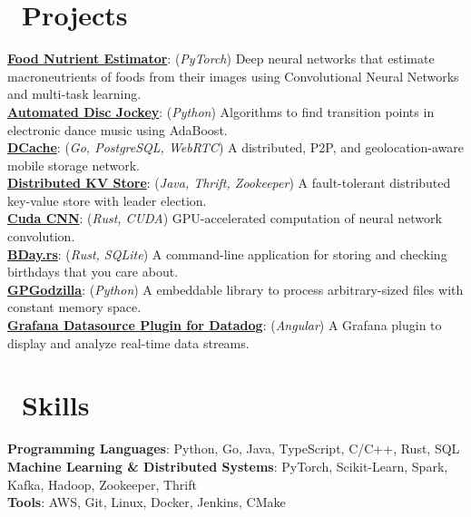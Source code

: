 \documentclass{resume}
\begin{document}
\section{\faCodeFork\ Projects}
 {

  \fontsize{10.5pt}{1.25}\selectfont
  \href{https://github.com/yirzhou/11785-Nutrient-Estimation}{\textbf{Food Nutrient Estimator}}: (\emph{PyTorch}) Deep neural networks that estimate macroneutrients of foods from their images using Convolutional Neural Networks and multi-task learning. \\
  \href{https://github.com/pythonicmux/automated-dj-mlsp/tree/yirzhou}{\textbf{Automated Disc Jockey}}: (\emph{Python}) Algorithms to find transition points in electronic dance music using AdaBoost. \\
  \href{https://drive.google.com/file/d/1Svd-wbXZiO84QmVKnKBp1cClJb2uvtWT/view?usp=sharing}{\textbf{DCache}}: (\emph{Go, PostgreSQL, WebRTC}) A distributed, P2P, and geolocation-aware mobile storage network. \\
  \href{https://github.com/yirzhou/KVStore}{\textbf{Distributed KV Store}}: (\emph{Java, Thrift, Zookeeper}) A fault-tolerant distributed key-value store with leader election. \\
  \href{https://github.com/yirzhou/CudaCNN}{\textbf{Cuda CNN}}: (\emph{Rust, CUDA}) GPU-accelerated computation of neural network convolution. \\
  \href{https://github.com/yirzhou/IsolatedSoul/tree/main/rsbday}{\textbf{BDay.rs}}: (\emph{Rust, SQLite}) A command-line application for storing and checking birthdays that you care about. \\
  \href{https://pypi.org/project/gpgodzilla/}{\textbf{GPGodzilla}}: (\emph{Python}) A embeddable library to process arbitrary-sized files with constant memory space. \\
  \href{https://github.com/Enflick/grafana-datasource-datadog/pull/7}{\textbf{Grafana Datasource Plugin for Datadog}}: (\emph{Angular}) A Grafana plugin to display and analyze real-time data streams. \\
  \par
 }

\section{\faCogs\ Skills}
 {
  \fontsize{10.5pt}{2}\selectfont
  \onehalfspacing
  \textbf{Programming Languages}: Python, Go, Java, TypeScript, C/C++, Rust, SQL \\
  \textbf{Machine Learning \& Distributed Systems}: PyTorch, Scikit-Learn, Spark, Kafka, Hadoop, Zookeeper, Thrift \\
  \textbf{Tools}: AWS, Git, Linux, Docker, Jenkins, CMake
  \par
 }



%
%
\end{document}
